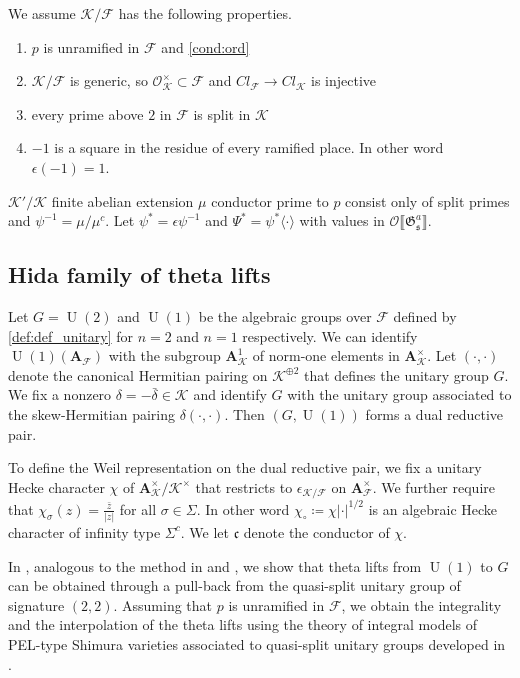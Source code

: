 \documentclass[leqno]{amsart}
\theoremstyle{definition}
\theoremstyle{remark}
\newcommand{\oo}{\mathcal{O}}
\newcommand{\A}{\mathbf A}
\DeclareMathOperator{\UU}{U}
\newcommand{\fc}{\mathfrak{c}}
\newcommand{\fs}{\mathfrak{s}}
\newcommand{\F}{{\mathcal{F}}} %
\newcommand{\K}{{\mathcal{K}}} %
\newcommand{\qch}{\epsilon} %
\newcommand{\fG}{\mathfrak{G}}
\begin{document}
We assume $\K/\F$
has the following properties.
\begin{enumerate}[label=($\K$\arabic*)]
\item $p$ is unramified in $\F$ and \eqref{cond:ord}
\label{cond:K1}
\item $\K/\F$ is generic, so $\oo_\K^\times\subset \F$
and $Cl_\F\to Cl_\K$ is injective
\label{cond:K2}
\item every prime above $2$ in $\F$ is split in $\K$
\label{cond:K3}
\item $-1$ is a square in the residue of every
ramified place. In other word $\qch(-1)=1$.
\label{cond:K4}
\end{enumerate}


$\K'/\K$ finite abelian extension
$\mu$ conductor prime to $p$
consist only of split primes
and $\psi^{-1}=\mu/\mu^c$.
Let $\psi^*=\epsilon\psi^{-1}$
and $\Psi^*=\psi^*\langle\cdot \rangle$
with values in $\oo\llbracket \fG_\fs^a\rrbracket$.

\subsection{Hida family of theta lifts}

Let $G=\UU(2)$ and $\UU(1)$
be the algebraic groups over $\F$
defined by \eqref{def:def_unitary}
for $n=2$ and $n=1$ respectively.
We can identify $\UU(1)(\A_\F)$
with the subgroup $\A_\K^1$ of norm-one
elements in $\A_\K^\times$.
Let $(\cdot,\cdot)$
denote the canonical Hermitian pairing on $\K^{\oplus 2}$
that defines the unitary group $G$.
We fix a nonzero $\delta=-\bar{\delta}\in \K$
and identify $G$ with the unitary group
associated to the skew-Hermitian pairing $\delta(\cdot,\cdot)$.
Then $(G, \UU(1))$ forms a dual reductive pair.

To define the Weil representation
on the dual reductive pair,
we fix a unitary Hecke character $\chi$ of 
$\A_{\K}^\times/\K^\times$
that restricts to $\qch_{\K/\F}$ on $\A_\F^\times$.
We further require that
$\chi_\sigma(z)=\frac{\bar{z}}{|z|}$
for all $\sigma\in \Sigma$.
In other word $\chi_\circ\coloneqq \chi|\cdot|^{1/2}$
is an algebraic Hecke character
of infinity type $\Sigma^c$.
We let $\fc$ denote the conductor of $\chi$.

In \cite{lee},
analogous to the method in
\cite{Hsieh2014} and \cite{wan},
we show that theta lifts
from $\UU(1)$ to $G$
can be obtained through a pull-back 
from the quasi-split unitary group
of signature $(2,2)$.
Assuming that $p$ is unramified in $\F$,
we obtain the integrality
and the interpolation of the theta lifts
using the theory of integral models
of PEL-type Shimura varieties
associated to quasi-split unitary groups
developed in \cite{Hida04}.
\end{document}
